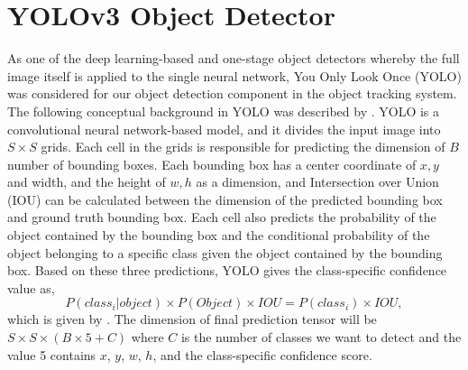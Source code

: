 \section{YOLOv3 Object Detector}
\label{sec:background/section_a}

As one of the deep learning-based and one-stage object detectors whereby the full image itself is applied to the single neural network, You Only Look Once (YOLO) was considered for our object detection component in the object tracking system. The following conceptual background in YOLO was described by \citeauthor{redmon_you_2016} \cite{redmon_you_2016}. YOLO is a convolutional neural network-based model, and it divides the input image into $S \times S$ grids. Each cell in the grids is responsible for predicting the dimension of $B$ number of bounding boxes. Each bounding box has a center coordinate of $x, y$ and width, and the height of $w, h$ as a dimension, and Intersection over Union (IOU) can be calculated between the dimension of the predicted bounding box and ground truth bounding box. Each cell also predicts the probability of the object contained by the bounding box and the conditional probability of the object belonging to a specific class given the object contained by the bounding box. Based on these three predictions, YOLO gives the class-specific confidence value as,
\begin{equation}
P(class_i | object) \times P(Object) \times IOU = P(class_i) \times IOU,
\label{eq:yolo_conf}
\end{equation}
which is given by \citeauthor{redmon_you_2016}. The dimension of final prediction tensor will be $S \times S \times (B \times 5 + C)$ where $C$ is the number of classes we want to detect and the value 5 contains $x$, $y$, $w$, $h$, and the class-specific confidence score.

